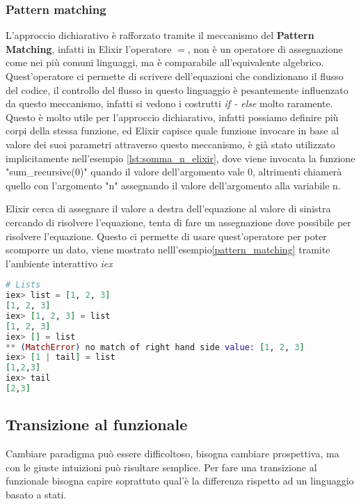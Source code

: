 \subsubsection{Pattern matching}

L'approccio dichiarativo è rafforzato tramite il meccanismo
del \textbf{Pattern Matching}, infatti in Elixir l'operatore $=$,
non è un operatore di assegnazione come nei più comuni linguaggi,
ma è comparabile all'equivalente algebrico.
Quest'operatore ci permette di scrivere dell'equazioni
che condizionano il flusso del codice, il controllo del flusso
in questo linguaggio è pesantemente influenzato da questo meccanismo,
infatti si vedono i costrutti \textit{if - else} molto raramente.
Questo è molto utile per l'approccio
dichiarativo, infatti possiamo definire più corpi della stessa funzione,
ed Elixir capisce quale funzione invocare in base
al valore dei suoi parametri attraverso questo meccanismo,
è già stato utilizzato implicitamente nell'esempio \ref{lst:somma_n_elixir},
dove viene invocata la funzione "sum\_recursive(0)" quando
il valore dell'argomento vale 0, altrimenti chiamerà quello
con l'argomento "n" assegnando il valore dell'argomento alla variabile n.

Elixir cerca di assegnare il valore a destra dell'equazione
al valore di sinistra cercando di risolvere l'equazione, tenta
di fare un assegnazione dove possibile per risolvere l'equazione.
Questo ci permette di usare quest'operatore per poter
scomporre un dato, viene mostrato nelll'esempio\ref{pattern_matching}
tramite l'ambiente interattivo \textit{iex}

\begin{lstlisting}[language=elixir, caption={Pattern Matching},captionpos=b,
	label={lst:pattern_matching}]
# Lists
iex> list = [1, 2, 3]
[1, 2, 3]
iex> [1, 2, 3] = list
[1, 2, 3]
iex> [] = list
** (MatchError) no match of right hand side value: [1, 2, 3]
iex> [1 | tail] = list
[1,2,3]
iex> tail
[2,3]
\end{lstlisting}


\subsection{Transizione al funzionale}

Cambiare paradigma può essere difficoltoso, bisogna
cambiare prospettiva, ma con le giuste intuizioni
può risultare semplice. Per fare una transizione al funzionale
bisogna capire soprattuto qual'è la differenza rispetto ad un
linguaggio basato a stati.

